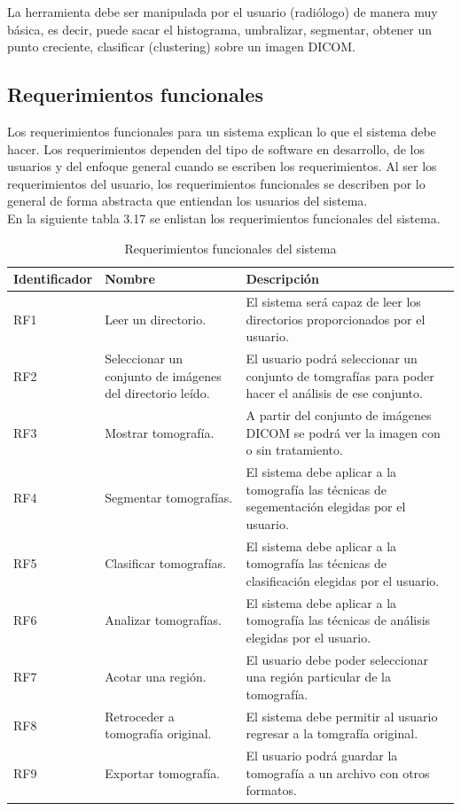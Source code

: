 \documentclass[12pt]{report}
\begin{document}
La herramienta debe ser manipulada por el usuario (radiólogo) de manera muy básica, es decir, puede sacar el histograma, umbralizar, segmentar, obtener un punto creciente, clasificar (clustering) sobre un imagen DICOM.
\subsection{Requerimientos funcionales}
Los requerimientos funcionales para un sistema explican lo que el sistema debe hacer. Los requerimientos dependen del tipo de software en desarrollo, de los usuarios y del enfoque general cuando se escriben los requerimientos. Al ser los requerimientos del usuario, los requerimientos funcionales se describen por lo general de forma abstracta que entiendan los usuarios del sistema. \cite{isRF}\\ 

En la siguiente tabla 3.17 se enlistan los requerimientos funcionales del sistema.\\ 

\begin{table}[H]
\begin{center}
\begin{tabular}{|p{23mm}|p{35mm}|p{75mm}|}
\hline
 Identificador & Nombre & Descripción \\
\hline \hline 
RF1 & Leer un directorio. & El sistema será capaz de leer los directorios proporcionados por el usuario.\\
\hline
RF2 & Seleccionar un conjunto de imágenes del directorio leído. & El usuario podrá seleccionar un conjunto de tomgrafías para poder hacer el análisis de ese conjunto.  \\
\hline
RF3 & Mostrar tomografía. & A partir del conjunto de imágenes DICOM se podrá ver la imagen con o sin tratamiento.  \\
\hline
RF4 & Segmentar tomografías. & El sistema debe aplicar a la tomografía las técnicas de segementación elegidas por el usuario.\\
\hline
RF5 & Clasificar tomografías. & El sistema debe aplicar a la tomografía las técnicas de clasificación elegidas por el usuario.\\
\hline
RF6 & Analizar tomografías. & El sistema debe aplicar a la tomografía las técnicas de análisis elegidas por el usuario. \\
\hline
RF7 & Acotar una región. & El usuario debe poder seleccionar una región particular de la tomografía.\\
\hline
RF8 & Retroceder a tomografía original. & El sistema debe permitir al usuario regresar a la tomgrafía original.\\
\hline
RF9 & Exportar tomografía. & El usuario podrá guardar la tomografía a un archivo con otros formatos.\\
\hline
\end{tabular}
\caption{Requerimientos funcionales del sistema}
\end{center}
\end{table}
\end{document}
